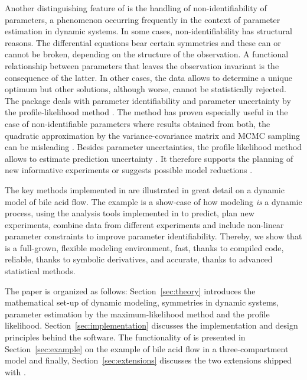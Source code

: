 \documentclass[article]{jss}
\begin{document}
Another distinguishing feature of  is the handling of non-identifiability of parameters, a phenomenon occurring frequently in the context of parameter estimation in dynamic systems.
In some cases, non-identifiability has structural reasons. The differential equations bear certain symmetries and these can or cannot be broken, depending on the structure of the observation. A functional relationship between parameters that leaves the observation invariant is the consequence of the latter. In other cases, the data allows to determine a unique optimum but other solutions, although worse, cannot be statistically rejected. The  package deals with parameter identifiability and parameter uncertainty by the profile-likelihood method \citep{murphy2000profile, raue2009structural, kreutz2013profile}. The method has proven especially useful in the case of non-identifiable parameters where results obtained from both, the quadratic approximation by the variance-covariance matrix and MCMC sampling can be misleading \citep{raue2013joining}. Besides parameter uncertainties, the profile likelihood method allows to estimate prediction uncertainty \citep{kreutz2012likelihood}. It therefore supports the planning of new informative experiments \citep{raue2011addressing} or suggests possible model reductions \citep{maiwald2016driving}.

The key methods implemented in  are illustrated in great detail on a dynamic model of bile acid flow. The example is a show-case of how modeling \textit{is} a dynamic process, using the analysis tools implemented in  to predict, plan new experiments, combine data from different experiments and include non-linear parameter constraints to improve parameter identifiability. Thereby, we show that  is a full-grown, flexible modeling environment, fast, thanks to compiled code, reliable, thanks to symbolic derivatives, and accurate, thanks to advanced statistical methods.

The paper is organized as follows: Section~\ref{sec:theory} introduces the mathematical set-up of dynamic modeling, symmetries in dynamic systems, parameter estimation by the maximum-likelihood method and the profile likelihood. Section~\ref{sec:implementation} discusses the implementation and design principles behind the  software. The functionality of  is presented in Section~\ref{sec:example} on the example of bile acid flow in a three-compartment model and finally, Section~\ref{sec:extensions} discusses the two  extensions shipped with .
\end{document}

